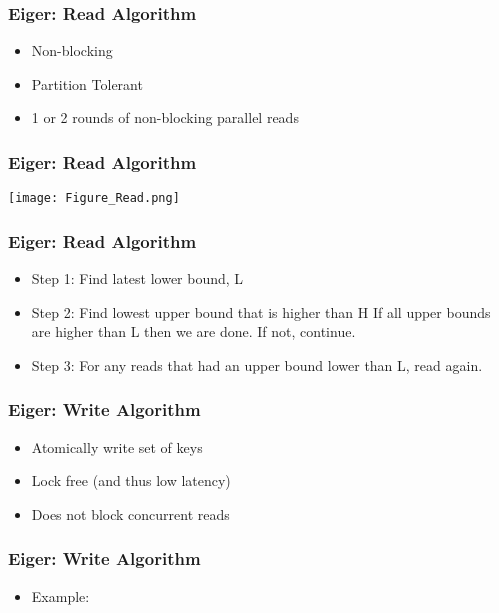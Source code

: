 \documentclass{beamer}
\begin{document}
\begin{frame}
\frametitle{Eiger: Read Algorithm}
\begin{itemize}
\item Non-blocking
\item Partition Tolerant
\item 1 or 2 rounds of non-blocking parallel reads
\end{itemize}  
\end{frame}

\begin{frame}
\frametitle{Eiger: Read Algorithm}
\texttt{[image: Figure\_Read.png]}
\end{frame}

\begin{frame}
\frametitle{Eiger: Read Algorithm}
\begin{itemize}
\item Step 1: Find latest lower bound, L
\item Step 2: Find lowest upper bound that is higher than H
\newline If all upper bounds are higher than L then we are done.  If not, continue. 
\item Step 3: For any reads that had an upper bound lower than L, read again.
\end{itemize}  
\end{frame}


\begin{frame}
\frametitle{Eiger: Write Algorithm}
\begin{itemize}
\item Atomically write set of keys
\pause \item Lock free (and thus low latency)
\pause \item Does not block concurrent reads
\end{itemize}  
\end{frame}

\begin{frame}
\frametitle{Eiger: Write Algorithm}
\begin{itemize}
	\item Example:
\end{itemize}  
\end{frame}
\end{document}
